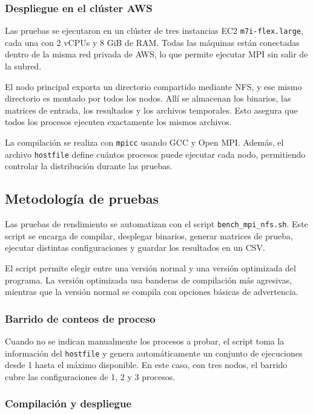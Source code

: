 \subsubsection{Despliegue en el clúster AWS}

Las pruebas se ejecutaron en un clúster de tres instancias EC2 \texttt{m7i-flex.large}, cada una con 2 vCPUs y 8 GiB de RAM. Todas las máquinas están conectadas dentro de la misma red privada de AWS, lo que permite ejecutar MPI sin salir de la subred.

El nodo principal exporta un directorio compartido mediante NFS, y ese mismo directorio es montado por todos los nodos. Allí se almacenan los binarios, las matrices de entrada, los resultados y los archivos temporales. Esto asegura que todos los procesos ejecuten exactamente los mismos archivos.

La compilación se realiza con \texttt{mpicc} usando GCC y Open MPI. Además, el archivo \texttt{hostfile} define cuántos procesos puede ejecutar cada nodo, permitiendo controlar la distribución durante las pruebas.

\subsection{Metodología de pruebas}

Las pruebas de rendimiento se automatizan con el script \texttt{bench\_mpi\_nfs.sh}. Este script se encarga de compilar, desplegar binarios, generar matrices de prueba, ejecutar distintas configuraciones y guardar los resultados en un CSV.

El script permite elegir entre una versión normal y una versión optimizada del programa. La versión optimizada usa banderas de compilación más agresivas, mientras que la versión normal se compila con opciones básicas de advertencia.

\subsubsection{Barrido de conteos de proceso}

Cuando no se indican manualmente los procesos a probar, el script toma la información del \texttt{hostfile} y genera automáticamente un conjunto de ejecuciones desde 1 hasta el máximo disponible. En este caso, con tres nodos, el barrido cubre las configuraciones de 1, 2 y 3 procesos.

\subsubsection{Compilación y despliegue}

